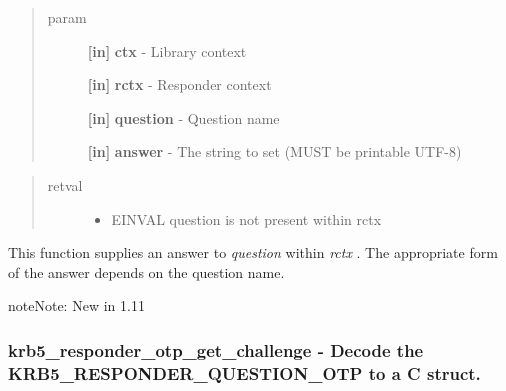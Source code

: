 \documentclass[letterpaper,10pt,english]{sphinxmanual}
\begin{document}
\begin{quote}\begin{description}
\item[{param}] \leavevmode
\textbf{{[}in{]}} \textbf{ctx} - Library context

\textbf{{[}in{]}} \textbf{rctx} - Responder context

\textbf{{[}in{]}} \textbf{question} - Question name

\textbf{{[}in{]}} \textbf{answer} - The string to set (MUST be printable UTF-8)

\end{description}\end{quote}
\begin{quote}\begin{description}
\item[{retval}] \leavevmode\begin{itemize}
\item {} 
EINVAL    question is not present within rctx

\end{itemize}

\end{description}\end{quote}

This function supplies an answer to \emph{question} within \emph{rctx} . The appropriate form of the answer depends on the question name.

\begin{notice}{note}{Note:}
New in 1.11
\end{notice}


\subsubsection{krb5\_responder\_otp\_get\_challenge -  Decode the KRB5\_RESPONDER\_QUESTION\_OTP to a C struct.}
\label{appdev/refs/api/krb5_responder_otp_get_challenge:krb5-responder-otp-get-challenge-decode-the-krb5-responder-question-otp-to-a-c-struct}\label{appdev/refs/api/krb5_responder_otp_get_challenge::doc}

\begin{fulllineitems}
\label{appdev/refs/api/krb5_responder_otp_get_challenge:c.krb5_responder_otp_get_challenge}
\end{fulllineitems}
\end{document}
